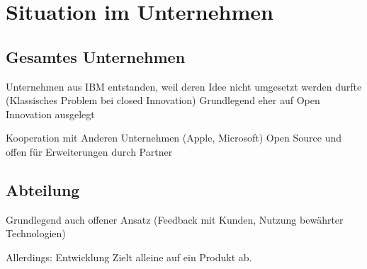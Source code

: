 \section{Situation im Unternehmen}\label{sec:unternehmen}

\subsection{Gesamtes Unternehmen}\label{sec:unternehmen-gesamt}

Unternehmen aus IBM entstanden, weil deren Idee nicht umgesetzt werden durfte
(Klassisches Problem bei closed Innovation)
Grundlegend eher auf Open Innovation ausgelegt

Kooperation mit Anderen Unternehmen (Apple, Microsoft)
Open Source und offen für Erweiterungen durch Partner



\subsection{Abteilung}\label{sec:unternehmen-abteilung}

Grundlegend auch offener Ansatz
(Feedback mit Kunden, Nutzung bewährter Technologien)

Allerdings: Entwicklung Zielt alleine auf ein Produkt ab.
